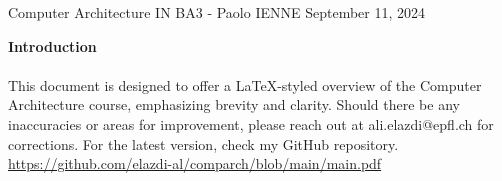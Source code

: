 
\begin{titlepage}
    \centering
    \vspace*{1cm}
    \Huge
    Computer Architecture
    \vspace{10px}
    \newline
    \Large IN BA3 - Paolo IENNE
    \vfill
    \large
    September 11, 2024
\end{titlepage}

\begin{center}
    \vspace*{1cm}
    \textbf{Introduction}
    \newline
    \paragraph[short]{}{This document is designed to offer a LaTeX-styled overview of the Computer Architecture course, emphasizing brevity and clarity. Should there be any inaccuracies or areas for improvement, please reach out at ali.elazdi@epfl.ch for corrections. For the latest version, check my GitHub repository.}
    \newline
   \url{
        https://github.com/elazdi-al/comparch/blob/main/main.pdf
    }
    \newline
\end{center}

\tableofcontents

